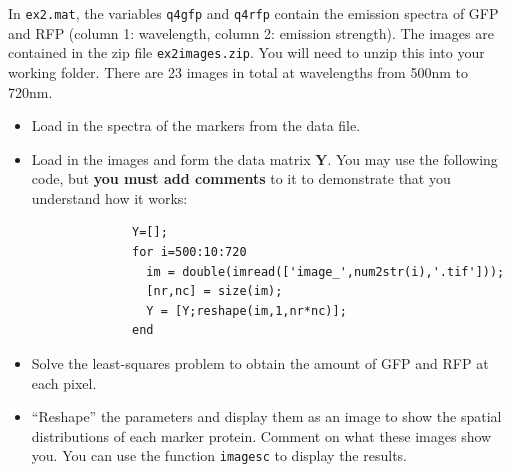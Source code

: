 \documentclass[12pt,a4paper]{tufte-handout}
\begin{document}
\begin{enumerate}
        In \texttt{ex2.mat}, the variables \texttt{q4gfp} and \texttt{q4rfp} contain the emission spectra of GFP and RFP (column 1: wavelength, column 2: emission strength). The images are contained in the zip file \texttt{ex2images.zip}. You will need to unzip this into your working folder. There are 23 images in total at wavelengths from 500nm to 720nm.
        \begin{itemize}
          \item Load in the spectra of the markers from the data file.
          \item Load in the images and form the data matrix $\mathbf{Y}$. You may use the following code, but \textbf{you must add comments} to it to demonstrate that you understand how it works:
            \begin{lstlisting}
              Y=[];
              for i=500:10:720
                im = double(imread(['image_',num2str(i),'.tif']));
                [nr,nc] = size(im);
                Y = [Y;reshape(im,1,nr*nc)];
              end
            \end{lstlisting}
          \item Solve the least-squares problem to obtain the amount of GFP and RFP at each pixel.
          \item ``Reshape'' the parameters and display them as an image to show the spatial distributions of each marker protein. Comment on what these images show you. You can use the function \texttt{imagesc} to display the results.
        \end{itemize}
        
\end{enumerate}
\end{document}
